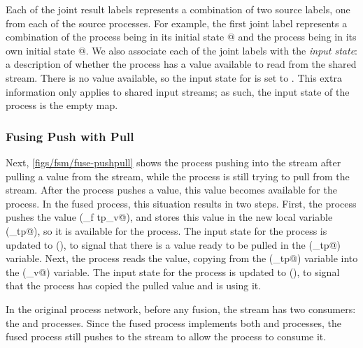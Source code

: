 Each of the joint result labels represents a combination of two source labels, one from each of the source processes.
For example, the first joint label  represents a combination of the \lstiproc@map@ process being in its initial state @ and the \lstiproc@regression@ process being in its own initial state @. 
We also associate each of the joint labels with the \emph{input state}: a description of whether the \lstiproc@regression@ process has a value available to read from the shared \lstiproc@timeprices@ stream.
There is no value available, so the input state for \lstiproc@timeprices@ is set to \lstiproc@none@.
This extra information only applies to shared input streams; as such, the input state of the \lstiproc@map@ process is the empty map.

\subsubsection{Fusing Push with Pull}
\label{s:Fusion:FusingPushPull}

Next, \cref{figs/fsm/fuse-pushpull} shows the \lstiproc@map@ process pushing into the \lstiproc@timeprices@ stream after pulling a value from the \lstiproc@stock@ stream, while the \lstiproc@regression@ process is still trying to pull from the \lstiproc@timeprices@ stream.
After the \lstiproc@map@ process pushes a value, this value becomes available for the \lstiproc@regression@ process.
In the fused process, this situation results in two steps.
First, the \lstiproc@map@ process pushes the value (\lstiproc@tp_f tp_v@), and stores this value in the new local variable (\lstiproc@chan_tp@), so it is available for the \lstiproc@regression@ process.
The input state for the \lstiproc@regression@ process is updated to (\lstiproc@pending@), to signal that there is a value ready to be pulled in the (\lstiproc@chan_tp@) variable.
Next, the \lstiproc@regression@ process reads the \lstiproc@pending@ value, copying from the (\lstiproc@chan_tp@) variable into the (\lstiproc@reg_v@) variable.
The input state for the \lstiproc@regression@ process is updated to (\lstiproc@have@), to signal that the \lstiproc@regression@ process has copied the pulled value and is using it.

In the original process network, before any fusion, the \lstiproc@timeprices@ stream has two consumers: the \lstiproc@regression@ and \lstiproc@correlation@ processes.
Since the fused process implements both \lstiproc@map@ and \lstiproc@regression@ processes, the fused process still pushes to the \lstiproc@timeprices@ stream to allow the \lstiproc@correlation@ process to consume it.

